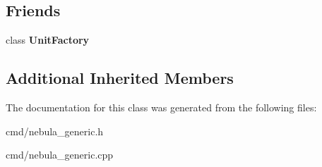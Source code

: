 \subsection*{Friends}
\begin{DoxyCompactItemize}
\item 
class {\bfseries Unit\+Factory}\hypertarget{classNebula_a187c66d2d867f6265d3b0c99ffc34838}{}\label{classNebula_a187c66d2d867f6265d3b0c99ffc34838}

\end{DoxyCompactItemize}
\subsection*{Additional Inherited Members}


The documentation for this class was generated from the following files\+:\begin{DoxyCompactItemize}
\item 
cmd/nebula\+\_\+generic.\+h\item 
cmd/nebula\+\_\+generic.\+cpp\end{DoxyCompactItemize}
